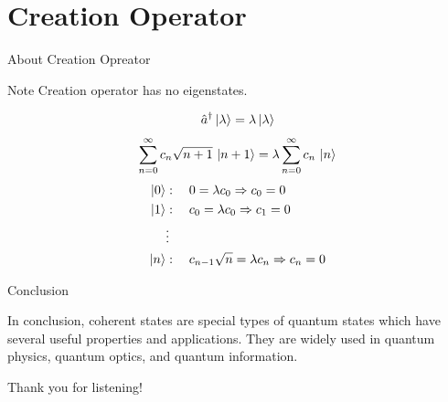 \documentclass{loyola-beamer}
\begin{document}
\section{Creation Operator}

\begin{frame}{About Creation Opreator}
	\begin{alertblock}{Note}
		Creation operator has no eigenstates.
	\end{alertblock}
	\begin{align*}
		\hat{a}^\dagger \ket{\lambda} = \lambda \ket{\lambda}
	\end{align*}
	\begin{align*}
		\sum_{n=0}^\infty c_n \sqrt{n+1}\, \ket{n+1}
		= \lambda \sum_{n=0}^\infty c_n\, \ket{n}
	\end{align*}
	\begin{align*}
		\ket{0} & : \quad 0 = \lambda c_0 \Rightarrow c_0 =0               \\
		\ket{1} & : \quad c_0 = \lambda c_0 \Rightarrow c_1 =0             \\
		        & \vdots                                                   \\
		\ket{n} & : \quad c_{n-1} \sqrt{n}=\lambda c_n \Rightarrow c_n = 0
	\end{align*}

\end{frame}

\begin{frame}{Conclusion}

	In conclusion, coherent states are special types of quantum states which have several
	useful properties and applications. They are widely used in quantum physics, quantum optics,
	and quantum information.

\end{frame}





\begin{titleframe}{Thank you for listening!}

\end{titleframe}
\end{document}
